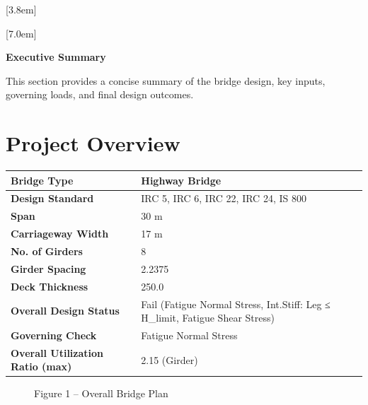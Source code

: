 \documentclass[12pt,a4paper]{report}
\numberwithin{table}{chapter}
\numberwithin{figure}{chapter}
\begin{document}
[3.8em]
  {\normalfont}
  {\contentslabel{2.3em}}
  {\hspace*{-2.3em}}
  {\hfill\contentspage}

[7.0em]
  {\normalfont}
  {\contentslabel{3.2em}}
  {\hspace*{-3.2em}}
  {\hfill\contentspage}

\newpage
\renewcommand{\contentsname}{\centering\Large\bfseries Table of Contents}
\tableofcontents


\newpage
{\centering\Large\bfseries Executive Summary\par}
\vspace{0.8em}

This section provides a concise summary of the bridge design, key inputs, governing loads, and final design outcomes.

\section*{Project Overview}
\label{sec:project-overview}


\begin{tabular}{|L{5.5cm}|L{8.5cm}|}
\hline
\textbf{Bridge Type} & Highway Bridge \\
\hline
\textbf{Design Standard} & IRC 5, IRC 6, IRC 22, IRC 24, IS 800 \\
\hline
\textbf{Span} & 30 m \\
\hline
\textbf{Carriageway Width} & 17 m \\
\hline
\textbf{No. of Girders} & 8 \\
\hline
\textbf{Girder Spacing} & 2.2375 \\
\hline
\textbf{Deck Thickness} & 250.0 \\
\hline
\textbf{Overall Design Status} & Fail (Fatigue Normal Stress, Int.Stiff:\allowbreak{} Leg ≤ H\_\allowbreak{}limit, Fatigue Shear Stress) \\
\hline
\textbf{Governing Check} & Fatigue Normal Stress \\
\hline
\textbf{Overall Utilization Ratio (max)} & 2.15 (Girder) \\
\hline
\end{tabular}


\begin{figure}[H]
\centering
{}
\caption*{Figure 1 -- Overall Bridge Plan}
\end{figure}
\end{document}
